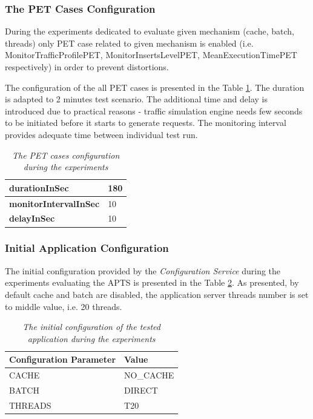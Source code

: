 \documentclass[12pt,a4paper]{article}
\begin{document}
\subsubsection{The PET Cases Configuration}

During the experiments dedicated to evaluate given mechanism (cache, batch, threads) only PET case related to given mechanism is enabled (i.e. MonitorTrafficProfilePET, MonitorInsertsLevelPET, MeanExecutionTimePET respectively) in order to prevent distortions. 

The configuration of the all PET cases is presented in the Table \ref{evaluationtestconf}. The duration is adapted to 2 minutes test scenario. The additional time and delay is introduced due to practical reasons - traffic simulation engine needs few seconds to be initiated before it starts to generate requests. The monitoring interval provides adequate time between individual test run.

\begin{table}[!htb]
\begin{center}
\begin{tabular}{l|l}
\textbf{durationInSec} & 180 \\ \hline
\textbf{monitorIntervalInSec} & 10 \\ \hline
\textbf{delayInSec} & 10\\
\end{tabular}
\end{center}
\caption{\textit{The PET cases configuration during the experiments}} \label{evaluationtestconf}
\end{table}


\subsubsection{Initial Application Configuration}

The initial configuration provided by the \textit{Configuration Service} during the experiments evaluating the APTS is presented in the Table \ref{table:initconfiguration}. As presented, by default cache and batch are disabled, the application server threads number is set to middle value, i.e. 20 threads. 

\begin{table}[!htb]
\begin{center}
\begin{tabular}{l|l}
\textbf{Configuration Parameter} & \textbf{Value} \\ \hline
CACHE & NO\_CACHE \\ \hline
BATCH & DIRECT\\ \hline
THREADS & T20\\
\end{tabular}
\end{center}
\caption{\textit{The initial configuration of the tested application during the experiments}} \label{table:initconfiguration}
\end{table}
\end{document}
